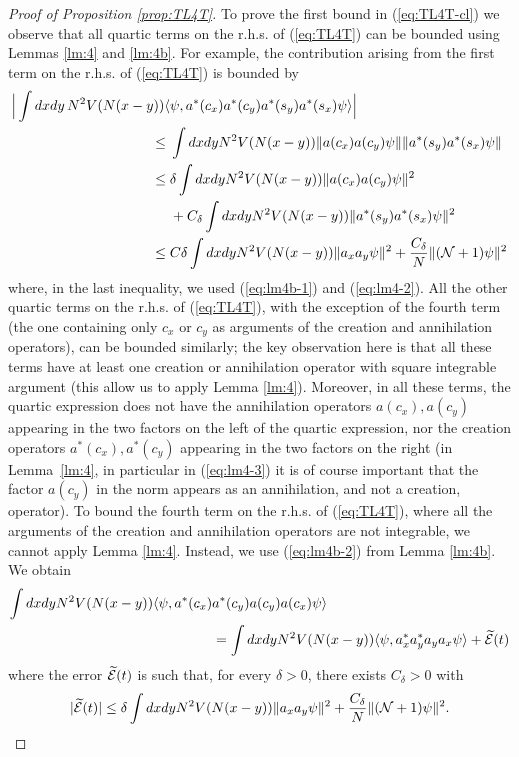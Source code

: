 \documentclass[11pt,a4paper]{article}
\newcommand{\wt}{\widetilde}
\newcommand{\cE}{{\cal E}}
\newcommand{\cN}{{\cal N}}
\begin{document}
\begin{proof}[Proof of Proposition \ref{prop:TL4T}] 
To prove the first bound in (\ref{eq:TL4T-cl}) we observe that all quartic terms on the r.h.s. of (\ref{eq:TL4T}) can be bounded using Lemmas \ref{lm:4} and \ref{lm:4b}. For example, the contribution arising from the 
first term on the r.h.s. of (\ref{eq:TL4T}) is bounded by
\[ \begin{split} 
\Big| \int dx dy \,  N^2 V (N (x-y)) \langle &\psi ,  a^* (c_x) a^* (c_y) a^* (s_y) a^* (s_x) \psi \rangle \Big| \\\leq \; & \int dx dy N^2 V(N (x-y)) \| a (c_x) a (c_y) \psi \| \| a^* (s_y) a^* (s_x) \psi \| \\
\leq \; & \delta \int dx dy N^2 V (N (x-y)) \| a (c_x) a(c_y) \psi \|^2 \\ &+C_\delta \int dx dy N^2 V(N (x-y)) \| a^* (s_y) a^* (s_x) \psi \|^2 \\
\leq \; & C \delta \int dx dy N^2 V (N (x-y)) \| a_x a_y \psi \|^2 + \frac{C_\delta}{N} \|(\cN+1) \psi \|^2 \end{split} \]
where, in the last inequality, we used (\ref{eq:lm4b-1})  and (\ref{eq:lm4-2}). All the other quartic terms on the r.h.s. of (\ref{eq:TL4T}), with the exception of the fourth term (the one containing only $c_x$ or $c_y$ as arguments of the creation and annihilation operators), can be bounded similarly; the key observation here is that all these terms have at least one creation or annihilation operator with square integrable argument (this allow us to apply Lemma \ref{lm:4}). Moreover, in all these terms, the quartic expression does not have the annihilation operators $a(c_x), a(c_y)$ appearing in the two factors on the left of the quartic expression, nor the creation operators $a^* (c_x), a^*  (c_y)$ appearing in the two factors on the right (in Lemma~\ref{lm:4}, in particular in (\ref{eq:lm4-3}) it is of course important that the factor $a(c_y)$ in the norm appears as an annihilation, and not a creation, operator). To bound the fourth term on the r.h.s. of (\ref{eq:TL4T}), where all the arguments of the creation and annihilation operators are not integrable, we cannot apply Lemma \ref{lm:4}. Instead, we use (\ref{eq:lm4b-2}) from Lemma \ref{lm:4b}. We obtain
\[ \begin{split}  \int dx dy N^2 V(N(x-y)) \langle \psi, a^* (c_x) &a^* (c_y) a(c_y) a(c_x) \psi \rangle \\ &=  \int dx dy N^2 V(N (x-y)) \langle \psi , a_x^* a_y^* a_y a_x \psi \rangle + \wt{\cE} (t) \end{split} \]
where the error $\wt{\cE} (t)$ is such that, for every $\delta > 0$, there exists $C_\delta >0$ with
\[ |\wt{\cE} (t)| \leq  \delta \int dx dy N^2 V(N (x-y)) \| a_x a_y \psi \|^2 + \frac{C_\delta}{N} \| (\cN+1) \psi \|^2. \]


\end{proof}
\end{document}
